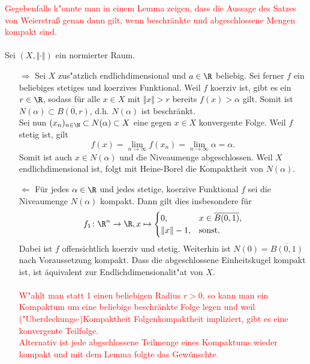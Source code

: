 
\textcolor{red}{Gegebenfalls k"onnte man in einem Lemma zeigen, dass die Aussage des Satzes von Weierstraß genau dann gilt, wenn beschränkte und abgeschlossene Mengen kompakt sind.}
\\\\
Sei $(X,\Vert\cdot\Vert)$ ein normierter Raum.\\
\begin{itemize}
 \item [$\Rightarrow$] Sei $X$ zus"atzlich endlichdimensional und $a\in\R$ beliebig.
 Sei ferner $f$ ein beliebiges stetiges und koerzives Funktional.
 Weil $f$ koerziv ist, gibt es ein 
 $r\in\R$, sodass für alle $x\in X$ mit $\Vert x\Vert>r$ bereits $f(x)>\alpha$ gilt. Somit ist $N(\alpha) \subset \overline{B(0,r)}$,
 d.h. $N(\alpha)$ ist beschränkt.\\
 Sei nun $(x_n)_{n\in\N}\subset N(\alpha)\subset X$ eine gegen $x\in X$ konvergente Folge. Weil $f$ stetig ist, gilt
 \begin{displaymath}
  f(x)=\lim_{n\to\infty} f(x_n) =\lim_{n\to\infty} \alpha =\alpha.
 \end{displaymath}
Somit ist auch $x\in N(\alpha)$ und die Niveaumenge abgeschlossen. Weil $X$ endlichdimensional ist, folgt mit Heine-Borel die Kompaktheit von $N(\alpha)$.\\
\item [$\Leftarrow$] Für jedes $\alpha\in \R$ und jedes stetige, koerzive Funktional $f$ sei die Niveaumenge $N(\alpha)$ kompakt. Dann gilt
dies insbesondere für
\begin{displaymath}
 f_1\colon \R^n\to \R, x\mapsto\begin{cases}
                              0, &x\in \overline{B(0,1)},\\
                              \Vert x\Vert -1,&\text{sonst.}
                             \end{cases}
\end{displaymath}
Dabei ist $f$ offensichtlich koerziv und stetig. Weiterhin ist $N(0)=\overline{B(0,1)}$ nach Voraussetzung kompakt.
Dass die abgeschlossene Einheitskugel kompakt ist, ist äquivalent zur Endlichdimensionalit"at von $X$.\\\\
\textcolor{red}{W"ahlt man statt 1 einen beliebigen Radius $r>0$, so kann man ein Kompaktum um eine beliebige beschränkte Folge legen und 
weil ("Uberdeckungs-)Kompaktheit Folgenkompaktheit impliziert, gibt es eine konvergente Teilfolge.\\
Alternativ ist jede abgschlossene Teilmenge eines Kompaktums wieder kompakt und mit dem Lemma folgte das Gewünschte.}
\end{itemize}
